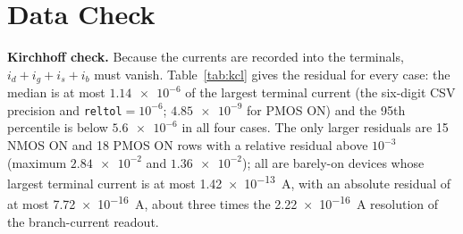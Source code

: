 \section{Data Check}\label{sec:datacheck}

\textbf{Kirchhoff check.} Because the currents are recorded into the terminals, $i_d+i_g+i_s+i_b$ must vanish. Table~\ref{tab:kcl} gives the residual for every case: the median is at most $\num{1.14e-6}$ of the largest terminal current (the six-digit CSV precision and \texttt{reltol}$=10^{-6}$; $\num{4.85e-9}$ for PMOS ON) and the 95th percentile is below $\num{5.6e-6}$ in all four cases. The only larger residuals are 15 NMOS ON and 18 PMOS ON rows with a relative residual above $10^{-3}$ (maximum $\num{2.84e-2}$ and $\num{1.36e-2}$); all are barely-on devices whose largest terminal current is at most \SI{1.42e-13}{\ampere}, with an absolute residual of at most \SI{7.72e-16}{\ampere}, about three times the \SI{2.22e-16}{\ampere} resolution of the branch-current readout.
\begin{table}[t]
\caption{Kirchhoff check of the four datasets (relative = divided by the largest terminal current of the row).}
\label{tab:kcl}
\centering\footnotesize
\setlength{\tabcolsep}{2.5pt}
\fitcol{}
\end{table}

